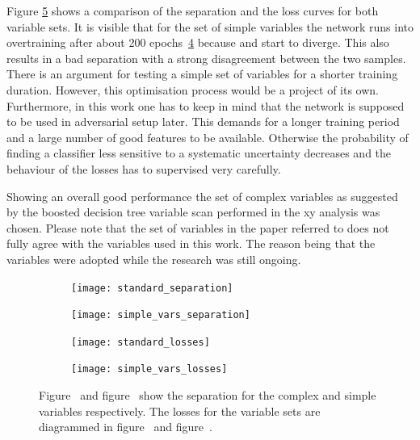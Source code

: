 Figure \ref{fig:vars} shows a comparison of the separation and the loss curves for both variable sets. It is visible that for the set of simple variables the network runs into overtraining after about \num{200} epochs~\ref{fig:vars:simple:loss} because \losstrain and \losstest start to diverge. This also results in a bad separation with a strong disagreement between the two samples. There is an argument for testing a simple set of variables for a shorter training duration. However, this optimisation process would be a project of its own. Furthermore, in this work one has to keep in mind that the network is supposed to be used in adversarial setup later. This demands for a longer training period and a large number of good features to be available. Otherwise the probability of finding a classifier less sensitive to a systematic uncertainty decreases and the behaviour of the losses has to supervised very carefully.

Showing an overall good performance the set of complex variables as suggested by the boosted decision tree variable scan performed in the xy analysis was chosen. Please note that the set of variables in the paper referred to does not fully agree with the variables used in this work. The reason being that the variables were adopted while the research was still ongoing.

\begin{figure}[htbp]
    \centering
    \begin{subfigure}[b]{0.45\textwidth}
        \texttt{[image: standard\_separation]}
        \caption{}
        \label{fig:vars:standard:sep}
    \end{subfigure}
\quad
    \begin{subfigure}[b]{0.45\textwidth}
        \texttt{[image: simple\_vars\_separation]}
        \caption{}
        \label{fig:vars:simple:sep}
    \end{subfigure}

    \begin{subfigure}[b]{0.45\textwidth}
		\texttt{[image: standard\_losses]}
		\caption{}
		\label{fig:vars:standard:loss}
	\end{subfigure}
\quad
	\begin{subfigure}[b]{0.45\textwidth}
		\texttt{[image: simple\_vars\_losses]}
		\caption{}
		\label{fig:vars:simple:loss}
	\end{subfigure}
    \caption{Figure~ and figure~ show the separation for the complex and simple variables respectively. The losses for the variable sets are diagrammed in figure~ and figure~.}
	\label{fig:vars}
\end{figure}





